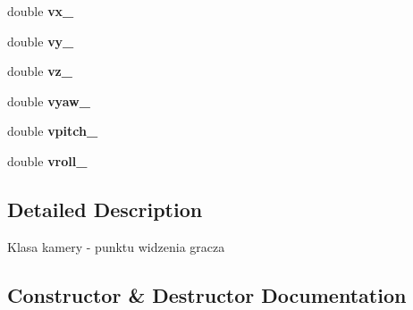 \begin{DoxyCompactItemize}
\item 
double {\bfseries vx\+\_\+}\hypertarget{class_camera_a7383b28a310ea2664874fbabe5e66e38}{}\label{class_camera_a7383b28a310ea2664874fbabe5e66e38}

\item 
double {\bfseries vy\+\_\+}\hypertarget{class_camera_aba5e551b383324cf19e4dfdff103229a}{}\label{class_camera_aba5e551b383324cf19e4dfdff103229a}

\item 
double {\bfseries vz\+\_\+}\hypertarget{class_camera_ae5770bf3fd53854d5dd9cdcbc18fdab3}{}\label{class_camera_ae5770bf3fd53854d5dd9cdcbc18fdab3}

\item 
double {\bfseries vyaw\+\_\+}\hypertarget{class_camera_af5a43904926f58b8fe1b3da391cdc9ea}{}\label{class_camera_af5a43904926f58b8fe1b3da391cdc9ea}

\item 
double {\bfseries vpitch\+\_\+}\hypertarget{class_camera_a0edd07cc2b7b294fddaf29dec22fc63a}{}\label{class_camera_a0edd07cc2b7b294fddaf29dec22fc63a}

\item 
double {\bfseries vroll\+\_\+}\hypertarget{class_camera_ad356a82282afe866ebf827eef7b9e1b3}{}\label{class_camera_ad356a82282afe866ebf827eef7b9e1b3}

\end{DoxyCompactItemize}


\subsection{Detailed Description}
Klasa kamery -\/ punktu widzenia gracza 

\subsection{Constructor \& Destructor Documentation}
